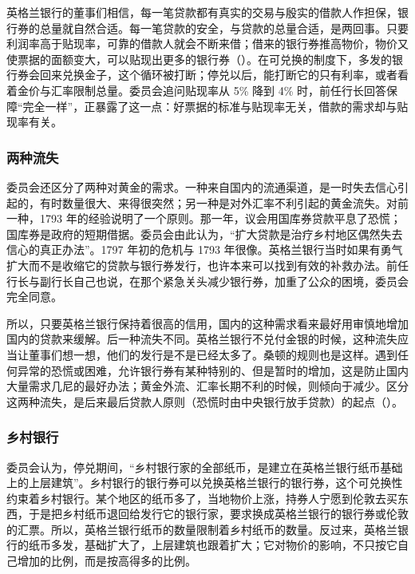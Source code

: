 \begin{pitfall}
英格兰银行的董事们相信，每一笔贷款都有真实的交易与殷实的借款人作担保，银行券的总量就自然合适。每一笔贷款的安全，与贷款的总量合适，是两回事。只要利润率高于贴现率，可靠的借款人就会不断来借；借来的银行券推高物价，物价又使票据的面额变大，可以贴现出更多的银行券（）。在可兑换的制度下，多发的银行券会回来兑换金子，这个循环被打断；停兑以后，能打断它的只有利率，或者看着金价与汇率限制总量。委员会追问贴现率从 5\% 降到 4\% 时，前任行长回答保障“完全一样”，正暴露了这一点：好票据的标准与贴现率无关，借款的需求却与贴现率有关。
\end{pitfall}

\subsubsection{两种流失}
委员会还区分了两种对黄金的需求。一种来自国内的流通渠道，是一时失去信心引起的，有时数量很大、来得很突然；另一种是对外汇率不利引起的黄金流失\cite{bullion1810}。对前一种，1793 年的经验说明了一个原则。那一年，议会用国库券贷款平息了恐慌；国库券是政府的短期借据。委员会由此认为，“扩大贷款是治疗乡村地区偶然失去信心的真正办法”\cite{bullion1810}。1797 年初的危机与 1793 年很像。英格兰银行当时如果有勇气扩大而不是收缩它的贷款与银行券发行，也许本来可以找到有效的补救办法。前任行长与副行长自己也说，在那个紧急关头减少银行券，加重了公众的困境，委员会完全同意\cite{bullion1810}。

所以，只要英格兰银行保持着很高的信用，国内的这种需求看来最好用审慎地增加国内的贷款来缓解。后一种流失不同。英格兰银行不兑付金银的时候，这种流失应当让董事们想一想，他们的发行是不是已经太多了\cite{bullion1810}。桑顿的规则也是这样。遇到任何异常的恐慌或困难，允许银行券有某种特别的、但是暂时的增加，这是防止国内大量需求几尼的最好办法；黄金外流、汇率长期不利的时候，则倾向于减少\cite{thornton1802}。区分这两种流失，是后来最后贷款人原则（恐慌时由中央银行放手贷款）的起点（）。

\subsubsection{乡村银行}
委员会认为，停兑期间，“乡村银行家的全部纸币，是建立在英格兰银行纸币基础上的上层建筑”\cite{bullion1810}。乡村银行的银行券可以兑换英格兰银行的银行券，这个可兑换性约束着乡村银行。某个地区的纸币多了，当地物价上涨，持券人宁愿到伦敦去买东西，于是把乡村纸币退回给发行它的银行家，要求换成英格兰银行的银行券或伦敦的汇票\cite{bullion1810}。所以，英格兰银行纸币的数量限制着乡村纸币的数量。反过来，英格兰银行的纸币多发，基础扩大了，上层建筑也跟着扩大；它对物价的影响，不只按它自己增加的比例，而是按高得多的比例\cite{bullion1810}。

